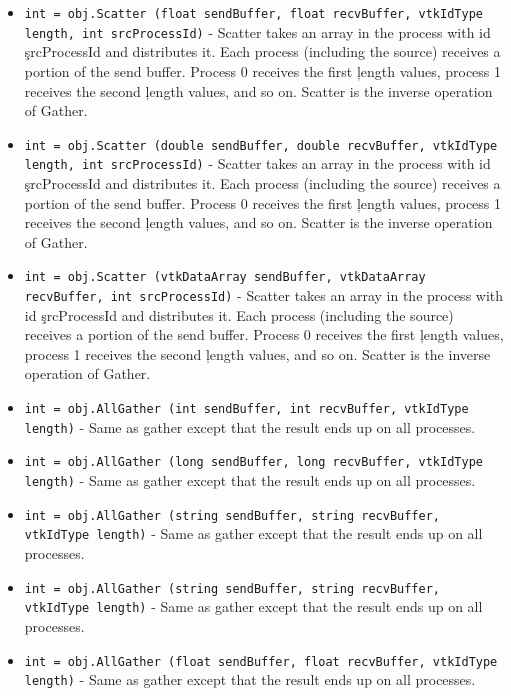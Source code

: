 \begin{itemize}
\item  \verb|int = obj.Scatter (float sendBuffer, float recvBuffer, vtkIdType length, int srcProcessId)| -  Scatter takes an array in the process with id \c srcProcessId and
 distributes it.  Each process (including the source) receives a portion of
 the send buffer.  Process 0 receives the first \c length values, process 1
 receives the second \c length values, and so on.  Scatter is the inverse
 operation of Gather.

\item  \verb|int = obj.Scatter (double sendBuffer, double recvBuffer, vtkIdType length, int srcProcessId)| -  Scatter takes an array in the process with id \c srcProcessId and
 distributes it.  Each process (including the source) receives a portion of
 the send buffer.  Process 0 receives the first \c length values, process 1
 receives the second \c length values, and so on.  Scatter is the inverse
 operation of Gather.

\item  \verb|int = obj.Scatter (vtkDataArray sendBuffer, vtkDataArray recvBuffer, int srcProcessId)| -  Scatter takes an array in the process with id \c srcProcessId and
 distributes it.  Each process (including the source) receives a portion of
 the send buffer.  Process 0 receives the first \c length values, process 1
 receives the second \c length values, and so on.  Scatter is the inverse
 operation of Gather.

\item  \verb|int = obj.AllGather (int sendBuffer, int recvBuffer, vtkIdType length)| -  Same as gather except that the result ends up on all processes.

\item  \verb|int = obj.AllGather (long sendBuffer, long recvBuffer, vtkIdType length)| -  Same as gather except that the result ends up on all processes.

\item  \verb|int = obj.AllGather (string sendBuffer, string recvBuffer, vtkIdType length)| -  Same as gather except that the result ends up on all processes.

\item  \verb|int = obj.AllGather (string sendBuffer, string recvBuffer, vtkIdType length)| -  Same as gather except that the result ends up on all processes.

\item  \verb|int = obj.AllGather (float sendBuffer, float recvBuffer, vtkIdType length)| -  Same as gather except that the result ends up on all processes.


\end{itemize}
